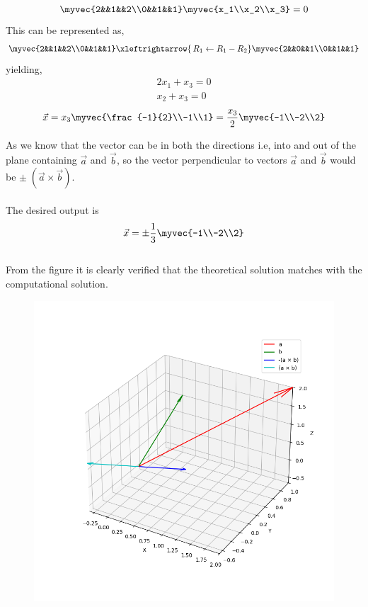 \documentclass[journal]{IEEEtran}
\begin{document}
\begin{align}
    \myvec{2&&1&&2\\0&&1&&1}\myvec{x_1\\x_2\\x_3}=0
\end{align}
This can be represented as,
\begin{align}
    \myvec{2&&1&&2\\0&&1&&1}
    \xleftrightarrow{\,R_1 \gets R_1-R_2}
    \myvec{2&&0&&1\\0&&1&&1}
\end{align}
yielding,
\begin{align}
    2x_1+x_3=0\\
    x_2+x_3=0
\end{align}
\begin{align}
    \vec{x}=x_3\myvec{\frac{-1}{2}\\-1\\1}=\frac{x_3}{2}\myvec{-1\\-2\\2}
\end{align}

\newpage
\vspace*{0.25cm}
As we know that the vector can be in both the directions i.e, into and out of the plane containing $\vec{a}$ and $\vec{b}$, so the vector perpendicular to vectors $\vec{a}$ and $\vec{b}$ would be $\pm\;(\vec{a} \times \vec{b})$.\\
\\
The desired output is
\begin{align}
    \vec{x}=\pm\frac{1}{3}\myvec{-1\\-2\\2}
\end{align}
\\
From the figure it is clearly verified that the theoretical solution matches with the computational solution.\\
\begin{figure}[H]
    \centering
    \includegraphics[width=0.8\columnwidth]{figs/Figure_1.png}
    \label{fig-1}
\end{figure}

 
\end{document}
